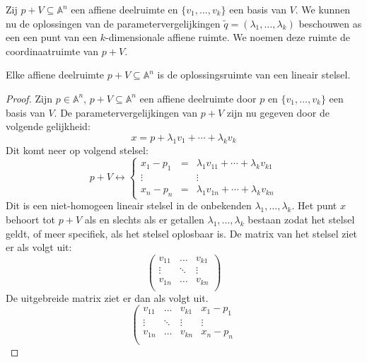 \documentclass[main.tex]{subfiles}
\begin{document}
\begin{de}
  Zij $p+V \subseteq \mathbb{A}^{n}$ een affiene deelruimte en $\{v_{1},\dotsc,v_{k}\}$ een basis van $V$.
  We kunnen nu de oplossingen van de parametervergelijkingen $\tilde{q} = (\lambda_{1},\dotsc,\lambda_{k})$ beschouwen as een een punt van een $k$-dimensionale affiene ruimte.
  We noemen deze ruimte de coordinaatruimte van $p+V$.
\end{de}

\begin{st}
  Elke affiene deelruimte $p+V \subseteq \mathbb{A}^{n}$ is de oplossingsruimte van een lineair stelsel.
  
  \begin{proof}
    Zijn $p\in\mathbb{A}^{n}$, $p+V\subseteq \mathbb{A}^{n}$ een affiene deelruimte door $p$ en $\{v_{1},\dotsc,v_{k}\}$ een basis van $V$.
    De parametervergelijkingen van $p+V$ zijn nu gegeven door de volgende gelijkheid:
    \[
    x = p + \lambda_1v_1 + \dotsb + \lambda_{k}v_{k}  
    \]
    Dit komt neer op volgend stelsel:
    \[
      p+V \leftrightarrow
      \left\{
      \begin{array}{rcl}
      x_{1} -p_{1} &=& \lambda_{1}v_{11} + \dotsb + \lambda_{k}v_{k1}\\
      \vdots && \vdots\\
      x_{n} -p_{n} &=& \lambda_{1}v_{1n} + \dotsb + \lambda_{k}v_{kn}
      \end{array}
      \right.
    \] 
    Dit is een niet-homogeen lineair stelsel in de onbekenden $\lambda_{1},\dotsc,\lambda_{k}$.
    Het punt $x$ behoort tot $p+V$ als en slechts als er getallen $\lambda_{1},\dotsc,\lambda_{k}$ bestaan zodat het stelsel geldt, of meer specifiek, als het stelsel oplosbaar is.
    De matrix van het stelsel ziet er als volgt uit:
    \[
    \begin{pmatrix}
    v_{11} & \hdots & v_{k1}\\
    \vdots & \ddots & \vdots\\
    v_{1n} & \hdots & v_{kn}\\
    \end{pmatrix}
    \] 
    De uitgebreide matrix ziet er dan als volgt uit.
    \[
    \left(
    \begin{array}{ccc|c}
    v_{11} & \hdots & v_{k1} & x_{1} - p_{1}\\
    \vdots & \ddots & \vdots & \vdots\\
    v_{1n} & \hdots & v_{kn} & x_{n} - p_{n}\\

\end{array}\]
\end{proof}
\end{st}
\end{document}
